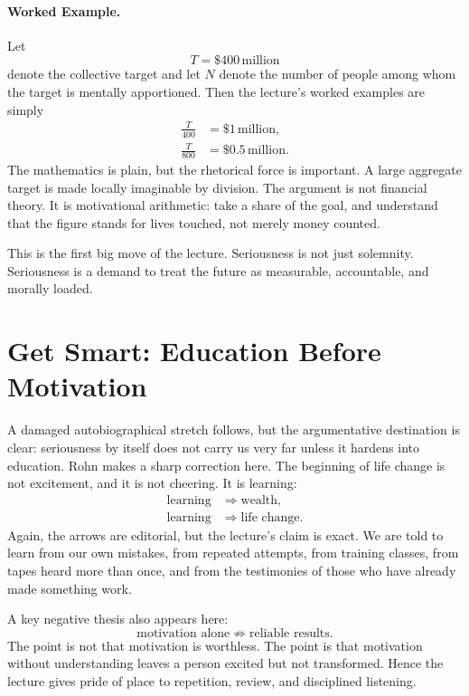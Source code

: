 \paragraph{Worked Example.}
Let
\begin{equation}
T = \$400\,\text{million}
\end{equation}
denote the collective target and let \(N\) denote the number of people among whom the target is mentally apportioned. Then the lecture's worked examples are simply
\begin{align}
\frac{T}{400} &= \$1\,\text{million},\\
\frac{T}{800} &= \$0.5\,\text{million}.
\end{align}
The mathematics is plain, but the rhetorical force is important. A large aggregate target is made locally imaginable by division. The argument is not financial theory. It is motivational arithmetic: take a share of the goal, and understand that the figure stands for lives touched, not merely money counted.

This is the first big move of the lecture. Seriousness is not just solemnity. Seriousness is a demand to treat the future as measurable, accountable, and morally loaded.

\section{Get Smart: Education Before Motivation}

A damaged autobiographical stretch follows, but the argumentative destination is clear: seriousness by itself does not carry us very far unless it hardens into education. Rohn makes a sharp correction here. The beginning of life change is not excitement, and it is not cheering. It is learning:
\begin{align}
\text{learning} &\Rightarrow \text{wealth},\\
\text{learning} &\Rightarrow \text{life change}.
\end{align}
Again, the arrows are editorial, but the lecture's claim is exact. We are told to learn from our own mistakes, from repeated attempts, from training classes, from tapes heard more than once, and from the testimonies of those who have already made something work.

A key negative thesis also appears here:
\begin{equation}
\text{motivation alone} \not\Rightarrow \text{reliable results}.
\end{equation}
The point is not that motivation is worthless. The point is that motivation without understanding leaves a person excited but not transformed. Hence the lecture gives pride of place to repetition, review, and disciplined listening.

